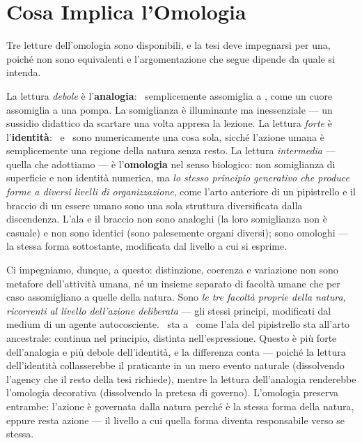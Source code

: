 \section{Cosa Implica l'Omologia}

Tre letture dell'omologia sono disponibili, e la tesi deve impegnarsi per una,
poich\'e non sono equivalenti e l'argomentazione che segue dipende da quale si
intenda.

La lettura \emph{debole} \`e l'\textbf{analogia}: \praxis\ semplicemente
assomiglia a \physis, come un cuore assomiglia a una pompa. La somiglianza \`e
illuminante ma inessenziale --- un sussidio didattico da scartare una volta
appresa la lezione. La lettura \emph{forte} \`e l'\textbf{identit\`a}: \praxis\
e \physis\ sono numericamente una cosa sola, sicch\'e l'azione umana \`e
semplicemente una regione della natura senza resto. La lettura \emph{intermedia}
--- quella che adottiamo --- \`e l'\textbf{omologia} nel senso biologico: non
somiglianza di superficie e non identit\`a numerica, ma \emph{lo stesso principio
generativo che produce forme a diversi livelli di organizzazione}, come l'arto
anteriore di un pipistrello e il braccio di un essere umano sono una sola
struttura diversificata dalla discendenza. L'ala e il braccio non sono analoghi
(la loro somiglianza non \`e casuale) e non sono identici (sono palesemente
organi diversi); sono omologhi --- la stessa forma sottostante, modificata dal
livello a cui si esprime.

Ci impegniamo, dunque, a questo: distinzione, coerenza e variazione non sono
metafore dell'attivit\`a umana, n\'e un insieme separato di facolt\`a umane che
per caso assomigliano a quelle della natura. Sono \emph{le tre facolt\`a proprie
della natura, ricorrenti al livello dell'azione deliberata} --- gli stessi
principi, modificati dal medium di un agente autocosciente. \praxis\ sta a
\physis\ come l'ala del pipistrello sta all'arto ancestrale: continua nel
principio, distinta nell'espressione. Questo \`e pi\`u forte dell'analogia e
pi\`u debole dell'identit\`a, e la differenza conta --- poich\'e la lettura
dell'identit\`a collasserebbe il praticante in un mero evento naturale
(dissolvendo l'agency che il resto della tesi richiede), mentre la lettura
dell'analogia renderebbe l'omologia decorativa (dissolvendo la pretesa di
governo). L'omologia preserva entrambe: l'azione \`e governata dalla natura
perch\'e \`e la stessa forma della natura, eppure resta azione --- il livello a
cui quella forma diventa responsabile verso se stessa.

